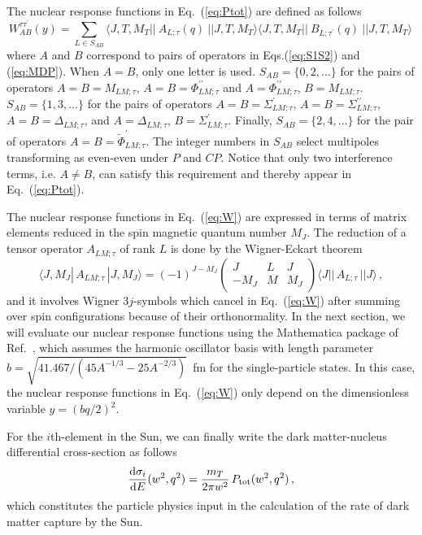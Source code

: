 \documentclass[11pt,a4paper]{article}
\begin{document}
The nuclear response functions in Eq.~(\ref{eq:Ptot}) are defined as follows   
\begin{equation}
W_{AB}^{\tau \tau^\prime}(y)= \sum_{L\in S_{AB}}  \langle J,T,M_T ||~ A_{L;\tau} (q)~ || J,T,M_T \rangle \langle J,T,M_T ||~ B_{L;\tau^\prime} (q)~ || J,T,M_T \rangle \,
\label{eq:W}
\end{equation}
where $A$ and $B$ correspond to pairs of operators in Eqs.(\ref{eq:S1S2}) and (\ref{eq:MDP}). When $A=B$, only one letter is used. $S_{AB}=\{0,2,\dots\}$ for the pairs of operators $A=B=M_{LM;\tau}$,  $A=B=\Phi^{\prime\prime}_{LM;\tau}$ and $A=\Phi^{\prime\prime}_{LM;\tau}$, $B=M_{LM;\tau}$. $S_{AB}=\{1,3,\dots\}$ for the pairs of operators $A=B=\Sigma^{\prime}_{LM;\tau}$, $A=B=\Sigma^{\prime\prime}_{LM;\tau}$, $A=B=\Delta_{LM;\tau}$, and $A=\Delta_{LM;\tau}$, $B=\Sigma^{\prime}_{LM;\tau}$. Finally, $S_{AB}=\{2,4,\dots\}$ for the pair of operators $A=B=\tilde{\Phi}^{\prime}_{LM;\tau}$. 
The integer numbers in $S_{AB}$ select multipoles transforming as even-even under $P$ and $CP$. Notice that only two interference terms, i.e. $A\neq B$, can satisfy this requirement and thereby appear in Eq.~(\ref{eq:Ptot}).

The nuclear response functions in Eq.~(\ref{eq:W}) are expressed in terms of matrix elements reduced in the spin magnetic quantum number $M_J$. The reduction of a tensor operator $A_{LM;\tau}$ of rank $L$ is done by the Wigner-Eckart theorem
\begin{equation}
\langle J,M_J |\,{A}_{LM;\tau}\,|J,M_J\rangle =(-1)^{J-M_J}\left(
\begin{array}{ccc} J&L&J\\
-M_J&M&M_J 
\end{array} 
\right)
\langle  J  ||\,{A}_{L;\tau}\,|| J  \rangle \,,
\label{eq:red}
\end{equation}
and it involves Wigner $3j$-symbols which cancel in Eq.~(\ref{eq:W}) after summing over spin configurations because of their orthonormality. In the next section, we will evaluate our nuclear response functions using the {\sffamily Mathematica} package of Ref.~\cite{Anand:2013yka}, which assumes the harmonic oscillator basis with length parameter $b=\sqrt{41.467/(45 A^{-1/3}-25A^{-2/3})}$~fm for the single-particle states. In this case, the nuclear response functions in Eq.~(\ref{eq:W}) only depend on the dimensionless variable $y=(bq/2)^2$.

For the $i$th-element in the Sun, we can finally write the dark matter-nucleus differential cross-section as follows 
\begin{equation}
\frac{{\rm d} \sigma_i}{{\rm d} E}(w^2,q^2) = \frac{m_T}{2\pi w^2} \,P_{\rm tot}({w}^2,{q}^2) \,,
\label{eq:sigma}
\end{equation}
which constitutes the particle physics input in the calculation of the rate of dark matter capture by the Sun.
\end{document}
